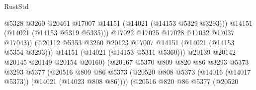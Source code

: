 \begin{lexlean}{RustStd}
\begin{coremodule}
                                                @5328
                                                @3260
                                                @20461
                                                @17007
                                                @14151
                                                (@14021 (@14153 @5329 @3293)))
                                              @14151
                                              (@14021 (@14153 @5319 @5335)))
                                            @17022
                                            @17025
                                            @17028
                                            @17032
                                            @17037
                                            @17043))
                                        (@20112
                                          @5353
                                          @3260
                                          @20123
                                          @17007
                                          @14151
                                          (@14021 (@14153 @5354 @3293)))
                                        @14151
                                        (@14021 (@14153 @5311 @5360)))
                                      @20139
                                      @20142
                                      @20145
                                      @20149
                                      @20154
                                      @20160)
                                    (@20167
                                      @5370
                                      @809
                                      @820
                                      @86
                                      @3293
                                      @5373
                                      @3293
                                      @5377
                                      (@20516
                                        @809
                                        @86
                                        @5373
                                        (@20520
                                          @808
                                          @5373
                                          (@14016 (@14017 @5373))
                                          (@14021 (@14023 @808 @86))))
                                      (@20516
                                        @820
                                        @86
                                        @5377
                                        (@20520

\end{coremodule}
\end{lexlean}
